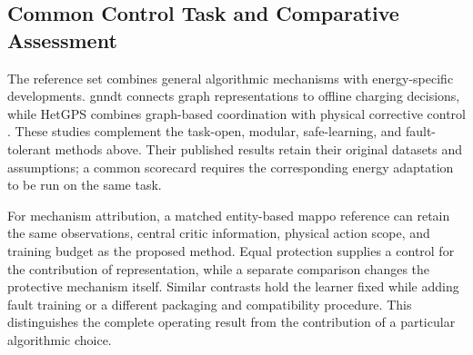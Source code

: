 \subsection{Common Control Task and Comparative Assessment}
\label{sec:control-sota-assessment}

The reference set combines general algorithmic mechanisms with energy-specific developments. \gls{gnndt} connects graph representations to offline charging decisions, while HetGPS combines graph-based coordination with physical corrective control \parencite{orfanoudakis2026gnndt,wang2026hetgps}. These studies complement the task-open, modular, safe-learning, and fault-tolerant methods above. Their published results retain their original datasets and assumptions; a common scorecard requires the corresponding energy adaptation to be run on the same task.

For mechanism attribution, a matched entity-based \gls{mappo} reference can retain the same observations, central critic information, physical action scope, and training budget as the proposed method. Equal protection supplies a control for the contribution of representation, while a separate comparison changes the protective mechanism itself. Similar contrasts hold the learner fixed while adding fault training or a different packaging and compatibility procedure. This distinguishes the complete operating result from the contribution of a particular algorithmic choice.

